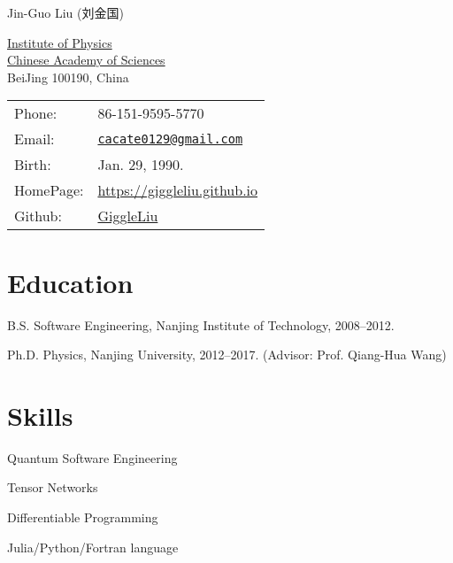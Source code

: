 \documentclass[letterpaper]{article}
\def\name{Jin-Guo Liu (刘金国)}
\renewenvironment{itemize}{
  \begin{list}{}{
    \setlength{\leftmargin}{1.5em}
  }
}{
  \end{list}
}
\begin{document}
{\huge \name}


\vspace{0.2in}

\begin{minipage}{0.45\linewidth}
    \href{http://english.iop.cas.cn/}{Institute of Physics\\
    Chinese Academy of Sciences}\\
    BeiJing 100190, China
\end{minipage}
\begin{minipage}{0.45\linewidth}
    \begin{tabular}{ll}
        Phone: & 86-151-9595-5770 \\
        Email: & \href{mailto:cacate0129@gmail.com}{\tt cacate0129@gmail.com} \\
        Birth: & Jan. 29, 1990.\\
        HomePage: & \href{https://giggleliu.github.io}{https://giggleliu.github.io}\\
        Github: & \href{https://github.com/GiggleLiu}{GiggleLiu}
    \end{tabular}
\end{minipage}



\section*{Education}

\begin{itemize}
    \item B.S. Software Engineering, Nanjing Institute of Technology, 2008--2012.
    \item Ph.D. Physics, Nanjing University, 2012--2017. (Advisor: Prof. Qiang-Hua Wang)
\end{itemize}

\section*{Skills}
\begin{itemize}
    \item Quantum Software Engineering
    \item Tensor Networks
    \item Differentiable Programming
    \item Julia/Python/Fortran language
\end{itemize}
\end{document}
